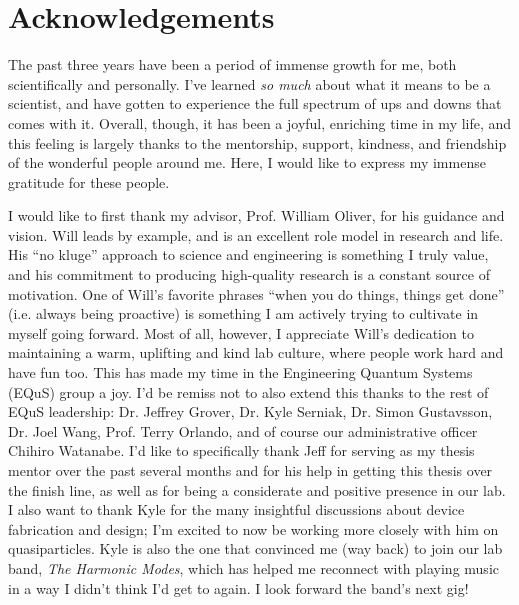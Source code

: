 \chapter*{Acknowledgements}
\begin{onehalfspacing}

The past three years have been a period of immense growth for me, both scientifically and personally. I've learned \textit{so much} about what it means to be a scientist, and have gotten to experience the full spectrum of ups and downs that comes with it. Overall, though, it has been a joyful, enriching time in my life, and this feeling is largely thanks to the mentorship, support, kindness, and friendship of the wonderful people around me. Here, I would like to express my immense gratitude for these people.

I would like to first thank my advisor, Prof. William Oliver, for his guidance and vision. Will leads by example, and is an excellent role model in research and life. His ``no kluge'' approach to science and engineering is something I truly value, and his commitment to producing high-quality research is a constant source of motivation. One of Will's favorite phrases ``when you do things, things get done'' (i.e. always being proactive) is something I am actively trying to cultivate in myself going forward. Most of all, however, I appreciate Will's dedication to maintaining a warm, uplifting and kind lab culture, where people work hard and have fun too. This has made my time in the Engineering Quantum Systems (EQuS) group a joy. I'd be remiss not to also extend this thanks to the rest of EQuS leadership: Dr. Jeffrey Grover, Dr. Kyle Serniak, Dr. Simon Gustavsson, Dr. Joel Wang, Prof. Terry Orlando, and of course our administrative officer Chihiro Watanabe. I'd like to specifically thank Jeff for serving as my thesis mentor over the past several months and for his help in getting this thesis over the finish line, as well as for being a considerate and positive presence in our lab. I also want to thank Kyle for the many insightful discussions about device fabrication and design; I'm excited to now be working more closely with him on quasiparticles. Kyle is also the one that convinced me (way back) to join our lab band, \textit{The Harmonic Modes}, which has helped me reconnect with playing music in a way I didn't think I'd get to again. I look forward the band's next gig!


\end{onehalfspacing}
